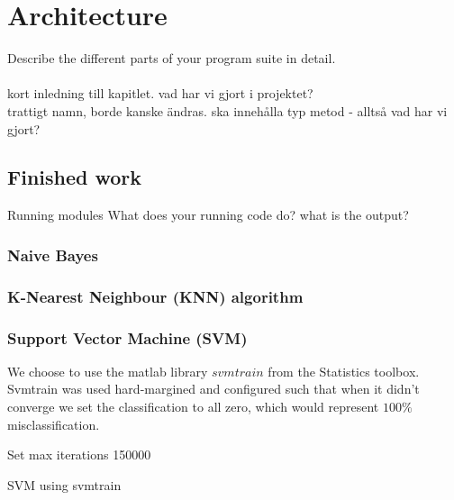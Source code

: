 \chapter{Architecture}
Describe the different parts of your program suite in detail.
\\\\
kort inledning till kapitlet. vad har vi gjort i projektet?\\
trattigt namn, borde kanske ändras. ska innehålla typ metod - alltså vad har vi gjort?

\section{Finished work}
Running modules
What does your running code do? what is the output?

\subsection{Naive Bayes}


\subsection{K-Nearest Neighbour (KNN) algorithm}

\subsection{Support Vector Machine (SVM)}
We choose to use the matlab library $svmtrain$ \citep{svmtrain_ref} from the Statistics toolbox. Svmtrain was used hard-margined and configured such that when it didn't converge we set the classification to all zero, which would represent $100\%$ misclassification. \\
\begin{algorithm}[H]
\label{algorithm:SVM}
\SetAlgoLined
{}

Set max iterations 150000 \\
 \caption{SVM using svmtrain}
\end{algorithm}



